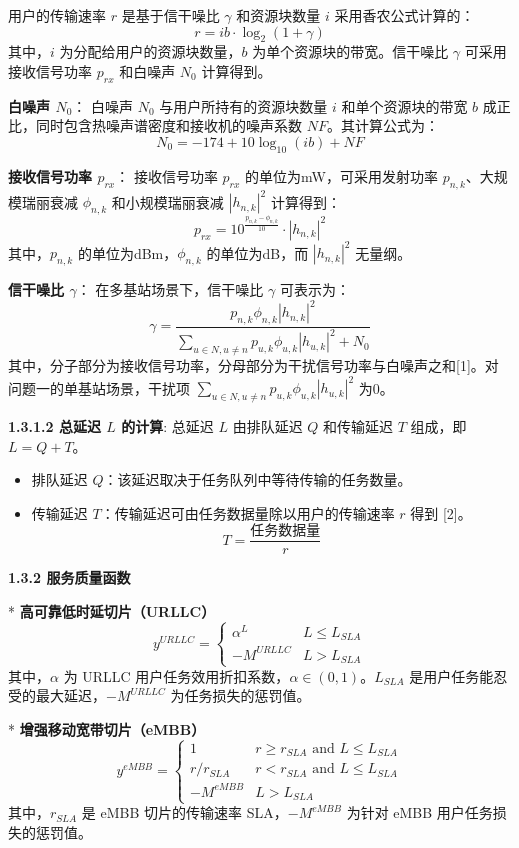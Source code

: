 \documentclass{ctexart}
\begin{document}
用户的传输速率 $r$ 是基于信干噪比 $\gamma$ 和资源块数量 $i$ 采用香农公式计算的：
$$r=ib \cdot \log_2(1+\gamma)$$
其中，$i$ 为分配给用户的资源块数量，$b$ 为单个资源块的带宽。信干噪比 $\gamma$ 可采用接收信号功率 $p_{rx}$ 和白噪声 $N_0$ 计算得到。

\textbf{白噪声 $N_0$}：
白噪声 $N_0$ 与用户所持有的资源块数量 $i$ 和单个资源块的带宽 $b$ 成正比，同时包含热噪声谱密度和接收机的噪声系数 $NF$。其计算公式为：
$$N_{0}=-174+10\log_{10}(ib)+NF$$

\textbf{接收信号功率 $p_{rx}$}：
接收信号功率 $p_{rx}$ 的单位为mW，可采用发射功率 $p_{n,k}$、大规模瑞丽衰减 $\phi_{n,k}$ 和小规模瑞丽衰减 $|h_{n,k}|^2$ 计算得到：
$$p_{rx}=10^{\frac{p_{n,k}-\phi_{n,k}}{10}}\cdot|h_{n,k}|^{2}$$
其中，$p_{n,k}$ 的单位为dBm，$\phi_{n,k}$ 的单位为dB，而 $|h_{n,k}|^2$ 无量纲。

\textbf{信干噪比 $\gamma$}：
在多基站场景下，信干噪比 $\gamma$ 可表示为：
$$\gamma=\frac{p_{n,k}\phi_{n,k}|h_{n,k}|^{2}}{\sum_{u\in N,u\ne n}p_{u,k}\phi_{u,k}|h_{u,k}|^{2}+N_{0}}$$
其中，分子部分为接收信号功率，分母部分为干扰信号功率与白噪声之和[1]。对问题一的单基站场景，干扰项 $\sum_{u\in N,u\ne n}p_{u,k}\phi_{u,k}|h_{u,k}|^{2}$ 为0。

\textbf{1.3.1.2 总延迟 $L$ 的计算}:
总延迟 $L$ 由排队延迟 $Q$ 和传输延迟 $T$ 组成，即 $L=Q+T$。
\begin{itemize}
 \item 排队延迟 $Q$：该延迟取决于任务队列中等待传输的任务数量。
 \item 传输延迟 $T$：传输延迟可由任务数据量除以用户的传输速率 $r$ 得到 [2]。$$T=\frac{\text{任务数据量}}{r}$$
\end{itemize}


\textbf{1.3.2 服务质量函数}

* \textbf{高可靠低时延切片（URLLC）}
 $$
 y^{URLLC}=\begin{cases}\alpha^{L}&L\le L_{SLA}\\ -M^{URLLC}&L>L_{SLA}\end{cases}
 $$
 其中，$\alpha$ 为 URLLC 用户任务效用折扣系数，$\alpha\in (0,1)$。$L_{SLA}$ 是用户任务能忍受的最大延迟，$-M^{URLLC}$ 为任务损失的惩罚值。

* \textbf{增强移动宽带切片（eMBB）}
 $$
 y^{eMBB}=\begin{cases}1&r\ge r_{SLA}\text{ and }L\le L_{SLA}\\ r/r_{SLA}&r<r_{SLA}\text{ and }L\le L_{SLA}\\ -M^{eMBB}&L>L_{SLA}\end{cases}
 $$
 其中，$r_{SLA}$ 是 eMBB 切片的传输速率 SLA，$-M^{eMBB}$ 为针对 eMBB 用户任务损失的惩罚值。
\end{document}

